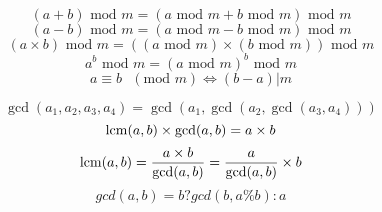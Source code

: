 $$ (a + b) \text{ mod } m = (a \text{ mod } m + b \text{ mod } m) \text{ mod } m $$
$$ (a - b) \text{ mod } m = (a \text{ mod } m - b \text{ mod } m) \text{ mod } m $$
$$ (a \times b) \text{ mod } m = ((a \text{ mod } m) \times (b \text{ mod } m)) \text{ mod } m $$
$$ a^b \text{ mod } m = (a \text{ mod } m)^b \text{ mod } m $$
$$ a \equiv b \text{ } (\text{mod } m) \iff (b - a) \vert m $$

$$ \gcd(a_1, a_2, a_3, a_4) = \gcd(a_1, \gcd(a_2, \gcd(a_3, a_4))) $$
$$ \mathrm{lcm}(a, b) \times \gcd(a, b) = a \times b $$
$$ \mathrm{lcm}(a, b) = \dfrac{a \times b}{\gcd(a, b)} = \dfrac{a}{\gcd(a,b)} \times b $$
$$ gcd(a, b) = b ? gcd(b, a \% b) : a $$